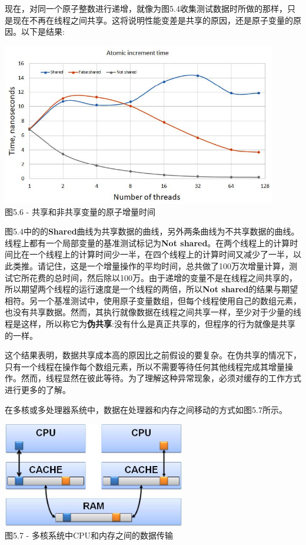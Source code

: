现在，对同一个原子整数进行递增，就像为图5.4收集测试数据时所做的那样，只是现在不再在线程之间共享。这将说明性能变差是共享的原因，还是原子变量的原因。以下是结果:

\begin{center}
\includegraphics[width=0.9\textwidth]{content/1/chapter5/images/6.jpg}\\
图5.6 - 共享和非共享变量的原子增量时间
\end{center}

图5.4中的的\textbf{Shared}曲线为共享数据的曲线，另外两条曲线为不共享数据的曲线。线程上都有一个局部变量的基准测试标记为\textbf{Not shared}。在两个线程上的计算时间比在一个线程上的计算时间少一半，在四个线程上的计算时间又减少了一半，以此类推。请记住，这是一个增量操作的平均时间，总共做了100万次增量计算，测试它所花费的总时间，然后除以100万。由于递增的变量不是在线程之间共享的，所以期望两个线程的运行速度是一个线程的两倍，所以\textbf{Not shared}的结果与期望相符。另一个基准测试中，使用原子变量数组，但每个线程使用自己的数组元素，也没有共享数据。然而，其执行就像数据在线程之间共享一样，至少对于少量的线程是这样，所以称它为\textbf{伪共享}:没有什么是真正共享的，但程序的行为就像是共享的一样。

这个结果表明，数据共享成本高的原因比之前假设的要复杂。在伪共享的情况下，只有一个线程在操作每个数组元素，所以不需要等待任何其他线程完成其增量操作。然而，线程显然在彼此等待。为了理解这种异常现象，必须对缓存的工作方式进行更多的了解。

在多核或多处理器系统中，数据在处理器和内存之间移动的方式如图5.7所示。

\begin{center}
\includegraphics[width=0.6\textwidth]{content/1/chapter5/images/7.jpg}\\
图5.7 - 多核系统中CPU和内存之间的数据传输
\end{center}

